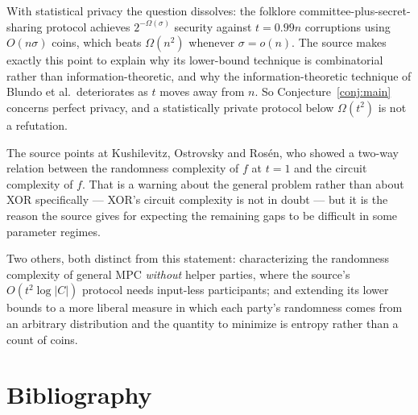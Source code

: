 \documentclass{aicr-conjecture}
\newcommand{\Om}{\Omega}
\begin{document}
\begin{remark}\label{rem:perfect}
With statistical privacy the question dissolves: the folklore
committee-plus-secret-sharing protocol achieves $2^{-\Om(\sigma)}$
security against $t = 0.99n$ corruptions using $O(n\sigma)$ coins, which
beats $\Om(n^{2})$ whenever $\sigma = o(n)$. The source makes exactly
this point to explain why its lower-bound technique is combinatorial
rather than information-theoretic, and why the information-theoretic
technique of Blundo et al.\ deteriorates as $t$ moves away from $n$. So
Conjecture~\ref{conj:main} concerns perfect privacy, and a statistically
private protocol below $\Om(t^{2})$ is not a refutation.
\end{remark}

\begin{remark}
The source points at Kushilevitz, Ostrovsky and Ros\'en, who showed a
two-way relation between the randomness complexity of $f$ at $t = 1$ and
the circuit complexity of $f$. That is a warning about the general
problem rather than about XOR specifically --- XOR's circuit complexity is
not in doubt --- but it is the reason the source gives for expecting the
remaining gaps to be difficult in some parameter regimes.
\end{remark}

\begin{remark}
Two others, both distinct from this statement: characterizing the
randomness complexity of general MPC \emph{without} helper parties, where
the source's $O(t^{2}\log|C|)$ protocol needs input-less participants;
and extending its lower bounds to a more liberal measure in which each
party's randomness comes from an arbitrary distribution and the quantity
to minimize is entropy rather than a count of coins.
\end{remark}

\section{Bibliography}
\end{document}
